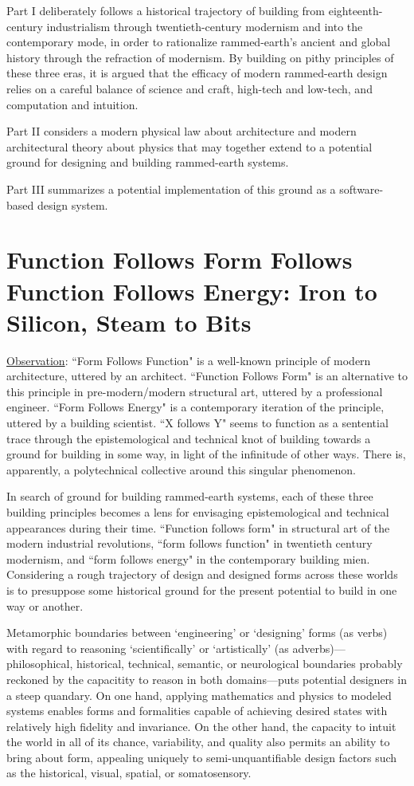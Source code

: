 Part I deliberately follows a historical trajectory of building from eighteenth-century industrialism through twentieth-century modernism and into the contemporary mode, in order to rationalize rammed-earth's ancient and global history through the refraction of modernism. By building on pithy principles of these three eras, it is argued that the efficacy of modern rammed-earth design relies on a careful balance of science and craft, high-tech and low-tech, and computation and intuition.

Part II considers a modern physical law about architecture and modern architectural theory about physics that may together extend to a potential ground for designing and building rammed-earth systems.

Part III summarizes a potential implementation of this ground as a software-based design system.

\clearpage

\section{Function Follows Form Follows Function Follows Energy: Iron to Silicon, Steam to Bits}

\underline{Observation}: ``Form Follows Function" is a well-known principle of modern architecture, uttered by an architect. ``Function Follows Form" is an alternative to this principle in pre-modern/modern structural art, uttered by a professional engineer. ``Form Follows Energy" is a contemporary iteration of the principle, uttered by a building scientist. ``X follows Y" seems to function as a sentential trace through the epistemological and technical knot of building towards a ground for building in some way, in light of the infinitude of other ways. There is, apparently, a polytechnical collective around this singular phenomenon.

In search of ground for building rammed-earth systems, each of these three building principles becomes a lens for envisaging epistemological and technical appearances during their time. ``Function follows form" in structural art of the modern industrial revolutions, ``form follows function" in twentieth century modernism, and ``form follows energy" in the contemporary building mien. Considering a rough trajectory of design and designed forms across these worlds is to presuppose some historical ground for the present potential to build in one way or another.

Metamorphic boundaries between `engineering' or `designing' forms (as verbs) with regard to reasoning `scientifically' or `artistically' (as adverbs)---philosophical, historical, technical, semantic, or neurological boundaries probably reckoned by the capacitity to reason in both domains---puts potential designers in a steep quandary. On one hand, applying mathematics and physics to modeled systems enables forms and formalities capable of achieving desired states with relatively high fidelity and invariance. On the other hand, the capacity to intuit the world in all of its chance, variability, and quality also permits an ability to bring about form, appealing uniquely to semi-unquantifiable design factors such as the historical, visual, spatial, or somatosensory.

